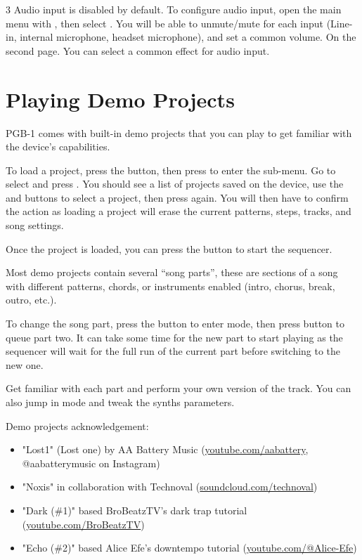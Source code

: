 \documentclass[8pt]{extarticle}
\def\device{PGB-1 }
\begin{document}
\begin{multicols*}{3}
Audio input is disabled by default. To configure audio input, open the main menu with , then select . You will be able to unmute/mute for each input (Line-in, internal microphone, headset microphone), and set a common volume. On the second page. You can select a common effect for audio input.

\section{Playing Demo Projects}

\device comes with built-in demo projects that you can play to get familiar with the device’s capabilities.

To load a project, press the  button, then press  to enter the  sub-menu. Go  to select  and press . You should see a list of projects saved on the device, use the  and  buttons to select a project, then press  again.
You will then have to confirm the action as loading a project will erase the current patterns, steps, tracks, and song settings.

Once the project is loaded, you can press the  button to start the sequencer.

Most demo projects contain several “song parts”, these are sections of a song with different patterns, chords, or instruments enabled (intro, chorus, break, outro, etc.).

To change the song part, press the  button to enter  mode, then press button  to queue part two. It can take some time for the new part to start playing as the sequencer will wait for the full run of the current part before switching to the new one.

Get familiar with each part and perform your own version of the track. You can also jump in  mode and tweak the synths parameters.

\hfill

Demo projects acknowledgement:
\begin{itemize}
    \item "Lost1" (Lost one) by AA Battery Music (\url{youtube.com/aabattery}, @aabatterymusic on Instagram)
    \item "Noxis" in collaboration with Technoval (\url{soundcloud.com/technoval})
    \item "Dark (\#1)" based BroBeatzTV's dark trap tutorial (\url{youtube.com/BroBeatzTV})
    \item "Echo (\#2)" based Alice Efe's downtempo tutorial (\url{youtube.com/@Alice-Efe})
\end{itemize}


\end{multicols*}
\end{document}
